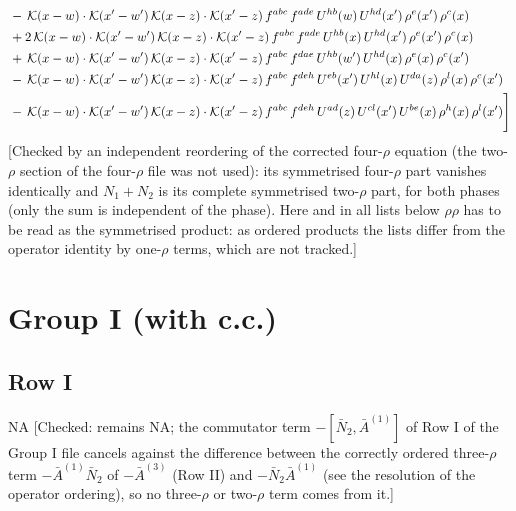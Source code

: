 \documentclass[9pt]{article}
\numberwithin{equation}{section}
\begin{document}
\begin{align}
&-\,\mathcal{K}(x-w)\cdot\mathcal{K}(x'-w')\,\mathcal{K}(x-z)\cdot\mathcal{K}(x'-z)\,f^{abc}\,f^{ade}\,U^{hb}(w)\,U^{hd}(x')\,\rho^{e}(x')\,\rho^{c}(x)\notag\\
&+2\,\mathcal{K}(x-w)\cdot\mathcal{K}(x'-w')\,\mathcal{K}(x-z)\cdot\mathcal{K}(x'-z)\,f^{abc}\,f^{ade}\,U^{hb}(x)\,U^{hd}(x')\,\rho^{e}(x')\,\rho^{c}(x)\notag\\
&+\,\mathcal{K}(x-w)\cdot\mathcal{K}(x'-w')\,\mathcal{K}(x-z)\cdot\mathcal{K}(x'-z)\,f^{abc}\,f^{dae}\,U^{hb}(w')\,U^{hd}(x)\,\rho^{e}(x)\,\rho^{c}(x')\notag\\
&-\,\mathcal{K}(x-w)\cdot\mathcal{K}(x'-w')\,\mathcal{K}(x-z)\cdot\mathcal{K}(x'-z)\,f^{abc}\,f^{deh}\,U^{eb}(x')\,U^{hl}(x)\,U^{da}(z)\,\rho^{l}(x)\,\rho^{c}(x')\notag\\
&-\,\mathcal{K}(x-w)\cdot\mathcal{K}(x'-w')\,\mathcal{K}(x-z)\cdot\mathcal{K}(x'-z)\,f^{abc}\,f^{deh}\,U^{ad}(z)\,U^{cl}(x')\,U^{be}(x)\,\rho^{h}(x)\,\rho^{l}(x')\Bigg]
\end{align} {\color{red}[Checked by an independent reordering of the corrected four-$\rho$ equation (the two-$\rho$ section of the four-$\rho$ file was not used): its symmetrised four-$\rho$ part vanishes identically and $N_{1}+N_{2}$ is its complete symmetrised two-$\rho$ part, for both phases (only the sum is independent of the phase). Here and in all lists below $\rho\rho$ has to be read as the symmetrised product: as ordered products the lists differ from the operator identity by one-$\rho$ terms, which are not tracked.]}\par\noindent 
\section{Group I (with c.c.)}
\subsection{Row I}
\textsc{NA} {\color{red}[Checked: remains NA; the commutator term $-[\bar N_{2},\bar A^{(1)}]$ of Row I of the Group I file cancels against the difference between the correctly ordered three-$\rho$ term $-\bar A^{(1)}\bar N_{2}$ of $-\bar A^{(3)}$ (Row II) and $-\bar N_{2}\bar A^{(1)}$ (see the resolution of the operator ordering), so no three-$\rho$ or two-$\rho$ term comes from it.]}
\end{document}
